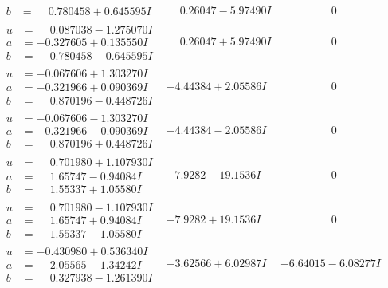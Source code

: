 \documentclass[1p]{elsarticle_modified}
\theoremstyle{definition}
\begin{document}
$$\begin{array}{c|c|c}
\begin{aligned}
b &= \phantom{-}0.780458 + 0.645595 I\end{aligned}
 & \phantom{-}0.26047 - 5.97490 I & \phantom{-0.000000 } 0 \\ \hline\begin{aligned}
u &= \phantom{-}0.087038 - 1.275070 I \\
a &= -0.327605 + 0.135550 I \\
b &= \phantom{-}0.780458 - 0.645595 I\end{aligned}
 & \phantom{-}0.26047 + 5.97490 I & \phantom{-0.000000 } 0 \\ \hline\begin{aligned}
u &= -0.067606 + 1.303270 I \\
a &= -0.321966 + 0.090369 I \\
b &= \phantom{-}0.870196 - 0.448726 I\end{aligned}
 & -4.44384 + 2.05586 I & \phantom{-0.000000 } 0 \\ \hline\begin{aligned}
u &= -0.067606 - 1.303270 I \\
a &= -0.321966 - 0.090369 I \\
b &= \phantom{-}0.870196 + 0.448726 I\end{aligned}
 & -4.44384 - 2.05586 I & \phantom{-0.000000 } 0 \\ \hline\begin{aligned}
u &= \phantom{-}0.701980 + 1.107930 I \\
a &= \phantom{-}1.65747 - 0.94084 I \\
b &= \phantom{-}1.55337 + 1.05580 I\end{aligned}
 & -7.9282 - 19.1536 I & \phantom{-0.000000 } 0 \\ \hline\begin{aligned}
u &= \phantom{-}0.701980 - 1.107930 I \\
a &= \phantom{-}1.65747 + 0.94084 I \\
b &= \phantom{-}1.55337 - 1.05580 I\end{aligned}
 & -7.9282 + 19.1536 I & \phantom{-0.000000 } 0 \\ \hline\begin{aligned}
u &= -0.430980 + 0.536340 I \\
a &= \phantom{-}2.05565 - 1.34242 I \\
b &= \phantom{-}0.327938 - 1.261390 I\end{aligned}
 & -3.62566 + 6.02987 I & -6.64015 - 6.08277 I \\ \hline\begin{aligned}

\end{aligned}
\end{array}$$
\end{document}

